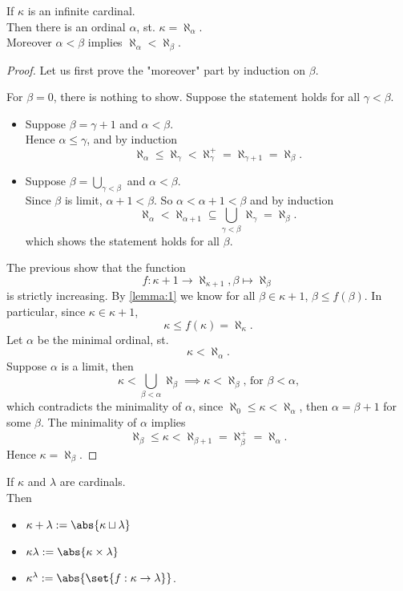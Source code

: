 \begin{proposition}
    If $\kappa$ is an infinite cardinal. \\
    Then there is an ordinal $\alpha$, st. $\kappa = \aleph_\alpha$.\\
    Moreover $\alpha< \beta$ implies $\aleph_\alpha < \aleph_\beta$.
\end{proposition}
\begin{proof}
    Let us first prove the "moreover" part by induction on $\beta$.

    For $\beta=0$, there is nothing to show. Suppose the statement holds for all $\gamma < \beta$.
    \begin{itemize}[label=-]
        \item Suppose $\beta = \gamma + 1$ and $\alpha < \beta$.\\
        Hence $\alpha \leq \gamma$, and by induction
        $$ \aleph_\alpha \leq \aleph_\gamma < \aleph_\gamma^+ = \aleph_{\gamma + 1} = \aleph_\beta.$$

        \item Suppose $\beta = \bigcup_{\gamma < \beta}$ and $\alpha < \beta$.\\
        Since $\beta$ is limit, $\alpha + 1 < \beta$. So $\alpha < \alpha + 1 < \beta$ and by induction
        $$ \aleph_\alpha < \aleph_{\alpha + 1} \subseteq \bigcup_{\gamma < \beta} \aleph_\gamma = \aleph_\beta. $$
        which shows the statement holds for all $\beta$.
    \end{itemize} 

    The previous show that the function
    $$ f: \kappa + 1 \to \aleph_{\kappa+1}, \beta \mapsto \aleph_\beta$$
    is strictly increasing. By \cref{lemma:1} we know for all $\beta \in \kappa + 1$, $\beta \leq f(\beta)$.
    In particular, since $\kappa \in \kappa + 1$,
    $$ \kappa \leq f(\kappa) = \aleph_\kappa.$$
    Let $\alpha$ be the minimal ordinal, st. 
    $$\kappa < \aleph_\alpha. $$
    Suppose $\alpha$ is a limit, then
    $$ \kappa < \bigcup_{\beta < \alpha} \aleph_\beta \implies \kappa < \aleph_\beta\text{, for $\beta < \alpha$,}$$
    which contradicts the minimality of $\alpha$, since $\aleph_0 \leq \kappa < \aleph_\alpha$, then $\alpha = \beta + 1$
    for some $\beta$. The minimality of $\alpha$ implies
    $$ \aleph_\beta \leq \kappa < \aleph_{\beta + 1} = \aleph_\beta^+ = \aleph_\alpha.$$
    Hence $\kappa = \aleph_\beta$.
\end{proof}

\newpage
\begin{definition}
    If $\kappa$ and $\lambda$ are cardinals.\\
    Then \begin{itemize}
        \item $\kappa + \lambda := \abs{\kappa \sqcup \lambda}$
        \item $\kappa \lambda := \abs{\kappa \times \lambda}$
        \item $\kappa^\lambda := \abs{\set{f: \kappa \to \lambda}}$.
    \end{itemize}
\end{definition}

